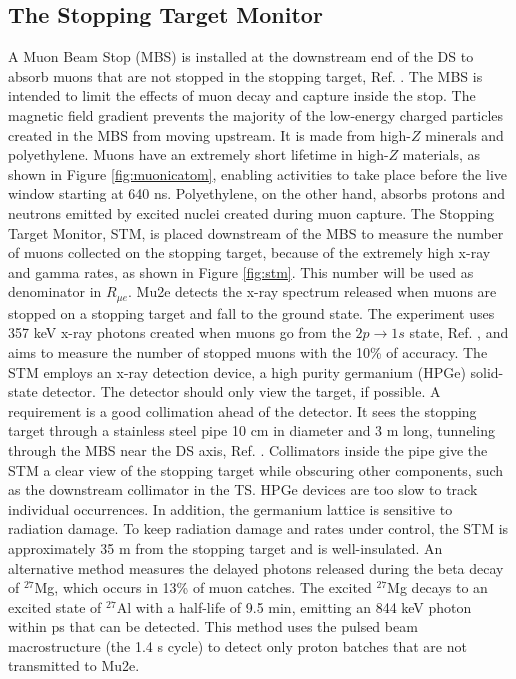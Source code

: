 \subsection{The Stopping Target Monitor}
A Muon Beam Stop (MBS) is installed at the downstream end of the DS to absorb muons that are not stopped in the stopping target, Ref. \cite{bartoszek2015mu2e}. The MBS is intended to limit the effects of muon decay and capture inside the stop. The magnetic field gradient prevents the majority of the low-energy charged particles created in the MBS from moving upstream. It is made from high-$Z$ minerals and polyethylene. Muons have an extremely short lifetime in high-$Z$ materials, as shown in Figure \ref{fig:muonicatom}, enabling activities to take place before the live window starting at 640 ns. Polyethylene, on the other hand, absorbs protons and neutrons emitted by excited nuclei created during muon capture.
The Stopping Target Monitor, STM, is placed downstream of the MBS to measure the number of muons collected on the stopping target, because of the extremely high x-ray and gamma rates, as shown in Figure \ref{fig:stm}. This number will be used as denominator in $R_{\mu e}$. Mu2e detects the x-ray spectrum released when muons are stopped on a stopping target and fall to the ground state. The experiment uses 357 keV x-ray photons created when muons go from the $2p \rightarrow 1s$ state, Ref. \cite{bobbb}, and aims to measure the number of stopped muons with the 10\% of accuracy. The STM employs an x-ray detection device, a high purity germanium (HPGe) solid-state detector. The detector should only view the target, if possible. A requirement is a good collimation ahead of the detector. It sees the stopping target through a stainless steel pipe 10 cm in diameter and 3 m long, tunneling through the MBS near the DS axis, Ref. \cite{stm}. Collimators inside the pipe give the STM a clear view of the stopping target while obscuring other components, such as the downstream collimator in the TS. HPGe devices are too slow to track individual occurrences. In addition, the germanium lattice is sensitive to radiation damage. To keep radiation damage and rates under control, the STM is approximately 35 m from the stopping target and is well-insulated. An alternative method measures the delayed photons released during the beta decay of $^{27}$Mg, which occurs in 13\% of muon catches. The excited $^{27}$Mg decays to an excited state of $^{27}$Al with a half-life of 9.5 min, emitting an 844 keV photon within ps that can be detected. This method uses the pulsed beam macrostructure (the 1.4 s cycle) to detect only proton batches that are not transmitted to Mu2e.
